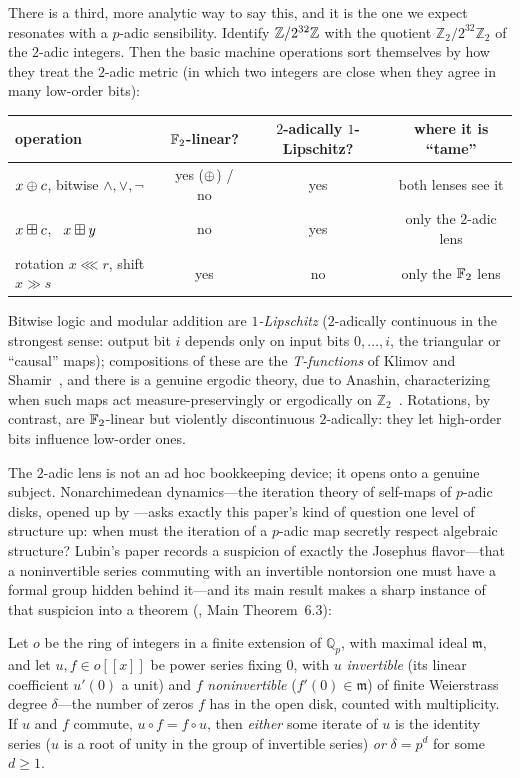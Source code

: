 There is a third, more analytic way to say this, and it is the one we
expect resonates with a $p$-adic sensibility. Identify $\mathbb{Z}/2^{32}\mathbb{Z}$ with the
quotient $\mathbb{Z}_2 / 2^{32}\mathbb{Z}_2$ of the $2$-adic integers.
Then the basic machine operations sort themselves by how they treat the
$2$-adic metric (in which two integers are close when they agree in many
low-order bits):
\begin{center}
  \begin{tabular}{@{}lccc@{}}
    \toprule
    operation & $\mathbb{F}_2$-linear? & $2$-adically $1$-Lipschitz? & where it is ``tame'' \\
    \midrule
    $x \oplus c$, bitwise $\wedge,\vee,\lnot$ & yes ($\oplus$) / no & yes & both lenses see it \\
    $x \boxplus c$, \ $x \boxplus y$          & no  & yes & only the $2$-adic lens \\
    rotation $x \lll r$, shift $x \gg s$       & yes & no  & only the $\mathbb{F}_2$ lens \\
    \bottomrule
  \end{tabular}
\end{center}
Bitwise logic and modular addition are \emph{$1$-Lipschitz} ($2$-adically
continuous in the strongest sense: output bit $i$ depends only on input
bits $0,\dots,i$, the triangular or ``causal'' maps); compositions of
these are the \emph{T-functions} of Klimov and
Shamir~\citep{KlimovShamir2003}, and there is a genuine ergodic theory,
due to Anashin, characterizing when such maps act
measure-preservingly or ergodically on $\mathbb{Z}_2$~\citep{Anashin2006}.
Rotations, by contrast, are $\mathbb{F}_2$-linear but violently discontinuous
$2$-adically: they let high-order bits influence low-order ones.

The $2$-adic lens is not an ad hoc bookkeeping device; it opens onto a
genuine subject. Nonarchimedean dynamics---the iteration theory of
self-maps of $p$-adic disks, opened up by \citet{Lubin1994}---asks
exactly this paper's kind of question one level of structure up: when
must the iteration of a $p$-adic map secretly respect algebraic
structure? Lubin's paper records a suspicion of exactly the Josephus
flavor---that a noninvertible series commuting with an invertible
nontorsion one must have a formal group hidden behind it---and its main
result makes a sharp instance of that suspicion into a theorem
(\citealp{Lubin1994}, Main Theorem~6.3):

\begin{theorem}[Lubin]\label{thm:lubin}
Let $o$ be the ring of integers in a finite extension of $\mathbb{Q}_p$,
with maximal ideal $\mathfrak m$, and let $u, f \in o[[x]]$ be power
series fixing $0$, with $u$ \emph{invertible} (its linear coefficient
$u'(0)$ a unit) and $f$ \emph{noninvertible} ($f'(0)\in\mathfrak m$) of
finite Weierstrass degree $\delta$---the number of zeros $f$ has in the
open disk, counted with multiplicity. If $u$ and $f$ commute,
$u\circ f = f\circ u$, then \emph{either} some iterate of $u$ is the
identity series ($u$ is a root of unity in the group of invertible
series) \emph{or} $\delta = p^{d}$ for some $d\ge 1$.
\end{theorem}

